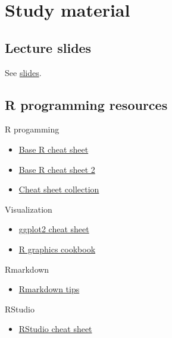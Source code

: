 \documentclass[
  oneside]{book}
\providecommand{\tightlist}{%
  \setlength{\itemsep}{0pt}\setlength{\parskip}{0pt}}
\begin{document}
\hypertarget{study-material}{%
\chapter{Study material}\label{study-material}}

\hypertarget{lecture-slides}{%
\section{Lecture slides}\label{lecture-slides}}

See \href{https://github.com/microbiome/course_2021_radboud/tree/main/slides}{slides}.

\hypertarget{r-programming-resources}{%
\section{R programming resources}\label{r-programming-resources}}

R progamming

\begin{itemize}
\tightlist
\item
  \href{https://www.rstudio.com/wp-content/uploads/2016/10/r-cheat-sheet-3.pdf}{Base R cheat sheet}
\item
  \href{https://raw.githubusercontent.com/rstudio/cheatsheets/master/base-r.pdf}{Base R cheat sheet 2}
\item
  \href{https://www.rstudio.com/resources/cheatsheets/}{Cheat sheet collection}
\end{itemize}

Visualization

\begin{itemize}
\tightlist
\item
  \href{https://www.rstudio.com/wp-content/uploads/2016/11/ggplot2-cheatsheet-2.1.pdf}{ggplot2 cheat sheet}
\item
  \href{http://www.cookbook-r.com/Graphs/}{R graphics cookbook}
\end{itemize}

Rmarkdown

\begin{itemize}
\tightlist
\item
  \href{https://rmarkdown.rstudio.com/}{Rmarkdown tips}
\end{itemize}

RStudio

\begin{itemize}
\tightlist
\item
  \href{https://www.rstudio.com/wp-content/uploads/2016/01/rstudio-IDE-cheatsheet.pdf}{RStudio cheat sheet}
\end{itemize}
\end{document}
